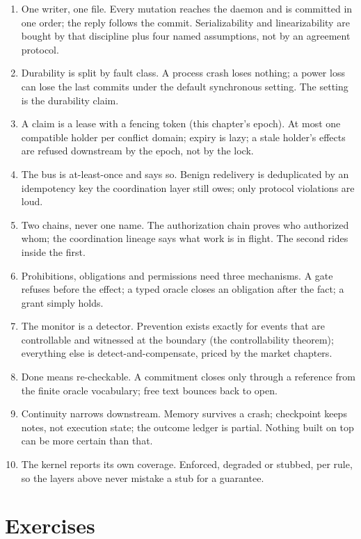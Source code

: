 \documentclass[11pt,a4paper]{article}
\theoremstyle{definition}
\theoremstyle{remark}
\begin{document}
\begin{enumerate}[leftmargin=1.6em,itemsep=2pt]
\item One writer, one file. Every mutation reaches the daemon and is committed in one
  order; the reply follows the commit. Serializability and linearizability are bought
  by that discipline plus four named assumptions, not by an agreement protocol.
\item Durability is split by fault class. A process crash loses nothing; a power loss
  can lose the last commits under the default synchronous setting. The setting is the
  durability claim.
\item A claim is a lease with a fencing token (this chapter's epoch). At most one compatible holder per
  conflict domain; expiry is lazy; a stale holder's effects are refused downstream by
  the epoch, not by the lock.
\item The bus is at-least-once and says so. Benign redelivery is deduplicated by an
  idempotency key the coordination layer still owes; only protocol violations are loud.
\item Two chains, never one name. The authorization chain proves who authorized whom;
  the coordination lineage says what work is in flight. The second rides inside the
  first.
\item Prohibitions, obligations and permissions need three mechanisms. A gate refuses
  before the effect; a typed oracle closes an obligation after the fact; a grant simply
  holds.
\item The monitor is a detector. Prevention exists exactly for events that are
  controllable and witnessed at the boundary (the controllability theorem); everything
  else is detect-and-compensate, priced by the market chapters.
\item Done means re-checkable. A commitment closes only through a reference from the
  finite oracle vocabulary; free text bounces back to open.
\item Continuity narrows downstream. Memory survives a crash; checkpoint keeps notes,
  not execution state; the outcome ledger is partial. Nothing built on top can be more
  certain than that.
\item The kernel reports its own coverage. Enforced, degraded or stubbed, per rule, so
  the layers above never mistake a stub for a guarantee.
\end{enumerate}

\section{Exercises}
\label{sec:swk-exercises}
\end{document}
